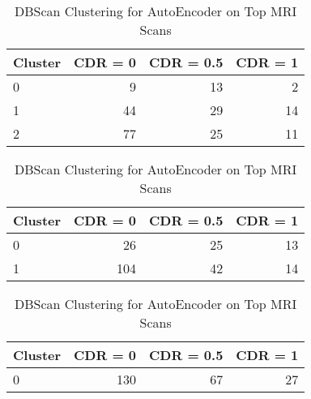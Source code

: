 \begin{table}[h] \centering
\begin{minipage}{0.3\textwidth}

\begin{tabular}{lrrr}
\toprule
Cluster & CDR = 0 & CDR = 0.5 & CDR = 1\\
\midrule
0 & 9 & 13 & 2\\
1 & 44 & 29 & 14\\
2 & 77 & 25 & 11\\
\bottomrule
\end{tabular}
\caption{Kmeans Clustering with 3 Clusters for AutoEncoder on Top MRI Scans}
\end{minipage}
\hspace{3cm}
\begin{minipage}{0.3\textwidth}

\begin{tabular}{lrrr}
\toprule
Cluster & CDR = 0 & CDR = 0.5 & CDR = 1\\
\midrule
0 & 26 & 25 & 13\\
1 & 104 & 42 & 14\\
\bottomrule
\end{tabular}
\caption{Kmeans Clustering with 2 Clusters for AutoEncoder on Top MRI Scans}
\end{minipage}
\hspace{3cm}
\begin{minipage}{0.3\textwidth}

\begin{tabular}{lrrr}
\toprule
Cluster & CDR = 0 & CDR = 0.5 & CDR = 1\\
\midrule
0 & 130 & 67 & 27\\
\bottomrule
\end{tabular}
\caption{DBScan Clustering for AutoEncoder on Top MRI Scans}
\end{minipage}
\end{table}
